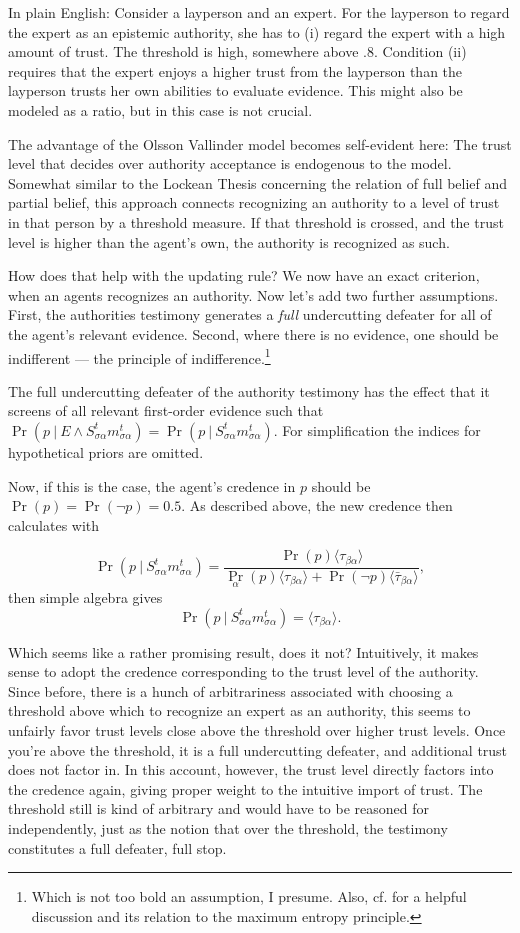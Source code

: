 \documentclass[11pt, a4paper]{scrartcl}
\newcommand{\Stsa}{S^t_{\sigma\alpha}}
\newcommand{\sa}{{\sigma\alpha}}
\newcommand{\given}[1][]{\:#1\vert\:}
\newcommand{\Sm}{\Stsa{}m^t_{\sa}}
\renewcommand{\i}[1]{\emph{#1}}
\renewcommand{\a}{\alpha}
\begin{document}
In plain English: Consider a layperson and an expert. For the layperson to regard the expert as an epistemic authority, she has to (i) regard the expert with a high amount of trust. The threshold is high, somewhere above $.8$. Condition (ii) requires that the expert enjoys a higher trust from the layperson than the layperson trusts her own abilities to evaluate evidence. This might also be modeled as a ratio, but in this case is not crucial.

The advantage of the Olsson Vallinder model becomes self-evident here: The trust level that decides over authority acceptance is endogenous to the model. Somewhat similar to the Lockean Thesis concerning the relation of full belief and partial belief, this approach connects recognizing an authority to a level of trust in that person by a threshold measure. If that threshold is crossed, and the trust level is higher than the agent's own, the authority is recognized as such. 

How does that help with the updating rule? We now have an exact criterion, when an agents recognizes an authority. Now let's add two further assumptions. First, the  authorities testimony generates a \i{full} undercutting defeater for all of the agent's relevant evidence. Second, where there is no evidence, one should be indifferent --- the principle of indifference.\footnote{Which is not too bold an assumption, I presume. Also, cf. \textcite[Ch. 5.3]{Titelbaum2017} for a helpful discussion and its relation to the maximum entropy principle.}   

The full undercutting defeater of the authority testimony has the effect that it screens of all relevant first-order evidence such that $\Pr(p \given E \land \Sm) = \Pr(p \given \Sm)$. For simplification the indices for hypothetical priors are omitted.

Now, if this is the case, the agent's credence in $p$ should be $\Pr(p) = \Pr(\neg p) = 0.5$. As described above, the new credence then calculates with 

\[
    \Pr(p \given \Sm) = \frac{\Pr(p) \langle \tau_{\beta\a} \rangle}
    {\Pr_\a(p) \langle \tau_{\beta\a} \rangle + \Pr(\neg p) \langle \bar{\tau}_{\beta\a} \rangle},
\]
then simple algebra gives 
\[
    \Pr(p \given \Sm ) = \langle \tau_{\beta\a} \rangle.
\]

Which seems like a rather promising result, does it not? Intuitively, it makes sense to adopt the credence corresponding to the trust level of the authority. Since before, there is a hunch of arbitrariness associated with  choosing a threshold above which to recognize an expert as an authority, this seems to unfairly favor trust levels close above the threshold over higher trust levels. Once you're above the threshold, it is a full undercutting defeater, and additional trust does not factor in. In this account, however, the trust level directly factors into the credence again, giving proper weight to the intuitive import of trust. The threshold still is kind of arbitrary and would have to be reasoned for independently, just as the notion that over the threshold, the testimony constitutes a full defeater, full stop.
\end{document}
